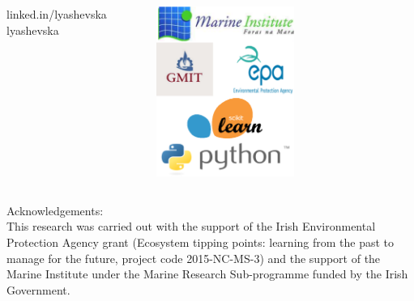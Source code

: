 \documentclass{beamer}
\begin{document}
\begin{frame}
\begin{columns}[c]    
\vspace{1cm}
    \flushleft{}%
    linked.in/lyashevska
    \\
\vspace{-1cm}
    lyashevska
\vspace{0.5cm}
\begin{figure}
    \includegraphics[width=4.5cm]{../fig/logos}
\end{figure}
\end{columns} 

\tiny Acknowledgements: \\

This research was carried out with the support of the Irish Environmental Protection Agency grant (Ecosystem tipping points: learning from the past to manage for the future, project code 2015-NC-MS-3) and the support of the Marine Institute under the Marine Research Sub-programme funded by the Irish Government.  \\
\end{frame}

%
%
\end{document}
